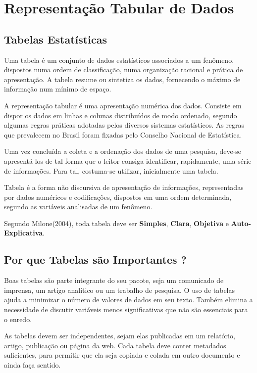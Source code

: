 \chapter{Representação Tabular de Dados}
\section{Tabelas Estatísticas}

Uma tabela é um conjunto de dados estatísticos associados a um fenômeno, dispostos numa ordem de classificação, numa organização racional e prática de apresentação. A tabela resume ou sintetiza os dados, fornecendo o máximo de informação num mínimo de espaço.\vskip0.3cm

A representação tabular é uma apresentação numérica dos dados. Consiste em dispor os dados em linhas e colunas distribuídos de modo ordenado, segundo algumas regras práticas adotadas pelos diversos sistemas estatísticos. As regras que prevalecem no Brasil foram fixadas pelo Conselho Nacional de Estatística.\vskip0.3cm

Uma vez concluída a coleta e a ordenação dos dados de uma pesquisa, deve-se apresentá-los de tal forma que o leitor consiga identificar, rapidamente, uma série de informações. Para tal, costuma-se utilizar, inicialmente uma tabela.\vskip0.3cm

Tabela é a forma não discursiva de apresentação de informações, representadas por dados numéricos e codificações, dispostos em uma ordem determinada, segundo as variáveis analisadas de um fenômeno.\vskip0.3cm

Segundo Milone(2004), toda tabela deve ser \textbf{Simples}, \textbf{Clara}, \textbf{Objetiva} e \textbf{Auto-Explicativa}.


\section{Por que Tabelas são Importantes ?}

Boas tabelas são parte integrante do seu pacote, seja um comunicado de imprensa, um artigo analítico ou um trabalho de pesquisa. O uso de tabelas ajuda a minimizar o número de valores de dados em seu texto. Também elimina a necessidade de discutir variáveis menos significativas que não são essenciais para o enredo.\vskip0.3cm


\newpage
As tabelas devem ser independentes, sejam elas publicadas em um relatório, artigo, publicação ou página da web. Cada tabela deve conter metadados suficientes, para permitir que ela seja copiada e colada em outro documento e ainda faça sentido.\vskip0.3cm

